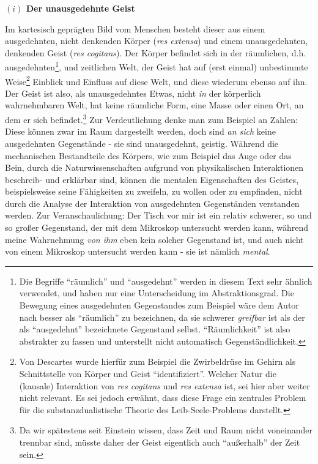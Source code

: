 \documentclass[a4paper, 12pt]{article}
\begin{document}
\begin{onehalfspace}

\vspace{5mm}
\noindent\textbf{$(i)$ Der unausgedehnte Geist}


\noindent Im kartesisch geprägten Bild vom Menschen besteht dieser aus einem ausgedehnten, nicht denkenden Körper (\emph{res extensa}) und einem unausgedehnten, denkenden Geist (\emph{res cogitans}). Der Körper befindet sich in der räumlichen, d.h. ausgedehnten\footnote{Die Begriffe "`räumlich"' und "`ausgedehnt"' werden in diesem Text sehr ähnlich verwendet, und haben nur eine Unterscheidung im Abstraktionsgrad. Die Bewegung eines ausgedehnten Gegenstandes zum Beispiel wäre dem Autor nach besser als "`räumlich"' zu bezeichnen, da sie schwerer \emph{greifbar} ist als der als "`ausgedehnt"' bezeichnete Gegenstand selbst. "`Räumlichkeit"' ist also abstrakter zu fassen und unterstellt nicht automatisch Gegenständlichkeit.}, und zeitlichen Welt, der Geist hat auf (erst einmal) unbestimmte Weise\footnote{Von Descartes wurde hierfür zum Beispiel die Zwirbeldrüse im Gehirn als Schnittstelle von Körper und Geist "`identifiziert"'. Welcher Natur die (kausale) Interaktion von \emph{res cogitans} und \emph{res extensa} ist, sei hier aber weiter nicht relevant. Es sei jedoch erwähnt, dass diese Frage ein zentrales Problem für die substanzdualistische Theorie des Leib-Seele-Problems darstellt.} Einblick und Einfluss auf diese Welt, und diese wiederum ebenso auf ihn. Der Geist ist also, als unausgedehntes Etwas, nicht \emph{in} der körperlich wahrnehmbaren Welt, hat keine räumliche Form, eine Masse oder einen Ort, an dem er sich befindet.\footnote{Da wir spätestens seit Einstein wissen, dass Zeit und Raum nicht voneinander trennbar sind, müsste daher der Geist eigentlich auch "`außerhalb"' der Zeit sein.} Zur Verdeutlichung denke man zum Beispiel an Zahlen: Diese können zwar im Raum dargestellt werden, doch sind \emph{an sich} keine ausgedehnten Gegenstände - sie sind unausgedehnt, geistig. Während die mechanischen Bestandteile des Körpers, wie zum Beispiel das Auge oder das Bein, durch die Naturwissenschaften aufgrund von physikalischen Interaktionen beschreib- und erklärbar sind, können die mentalen Eigenschaften des Geistes, beispielsweise seine Fähigkeiten zu zweifeln, zu wollen oder zu empfinden, nicht durch die Analyse der Interaktion von ausgedehnten Gegenständen verstanden werden. Zur Veranschaulichung: Der Tisch vor mir ist ein relativ schwerer, so und so großer Gegenstand, der mit dem Mikroskop untersucht werden kann, während meine Wahrnehmung \emph{von ihm} eben kein solcher Gegenstand ist, und auch nicht von einem Mikroskop untersucht werden kann - sie ist nämlich \emph{mental}. 


\end{onehalfspace}
\end{document}
